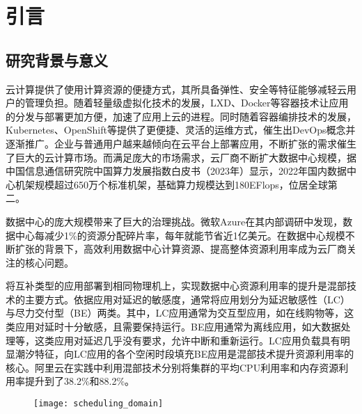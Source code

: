 \chapter{引言}\label{chap:introduction}

\section{研究背景与意义}


云计算提供了使用计算资源的便捷方式，其所具备弹性、安全等特征能够减轻云用户的管理负担。随着轻量级虚拟化技术的发展，LXD、Docker等容器技术让应用的分发与部署更加方便，加速了应用上云的进程。同时随着容器编排技术的发展，Kubernetes、OpenShift等提供了更便捷、灵活的运维方式，催生出DevOps概念并逐渐推广。企业与普通用户越来越倾向在云平台上部署应用，不断扩张的需求催生了巨大的云计算市场。而满足庞大的市场需求，云厂商不断扩大数据中心规模，据中国信息通信研究院中国算力发展指数白皮书（2023年）显示，2022年国内数据中心机架规模超过650万个标准机架，基础算力规模达到180EFlops，位居全球第二\citep{chinaict2023}。

数据中心的庞大规模带来了巨大的治理挑战。微软Azure在其内部调研中发现，数据中心每减少1\%的资源分配碎片率，每年就能节省近1亿美元\citep{hadary2020protean}。在数据中心规模不断扩张的背景下，高效利用数据中心计算资源、提高整体资源利用率成为云厂商关注的核心问题。

将互补类型的应用部署到相同物理机上，实现数据中心资源利用率的提升是混部技术的主要方式。依据应用对延迟的敏感度，通常将应用划分为延迟敏感性（LC）与尽力交付型（BE）两类。其中，LC应用通常为交互型应用，如在线购物等，这类应用对延时十分敏感，且需要保持运行。BE应用通常为离线应用，如大数据处理等，这类应用对延迟几乎没有要求，允许中断和重新运行。LC应用负载具有明显潮汐特征，向LC应用的各个空闲时段填充BE应用是混部技术提升资源利用率的核心。阿里云在实践中利用混部技术分别将集群的平均CPU利用率和内存资源利用率提升到了38.2\%和88.2\%\citep{guo2019limits}。

\begin{figure}[!htbp]
    \centering
    \texttt{[image: scheduling\_domain]}
    \label{fig:scheduling_domain}
\end{figure}

